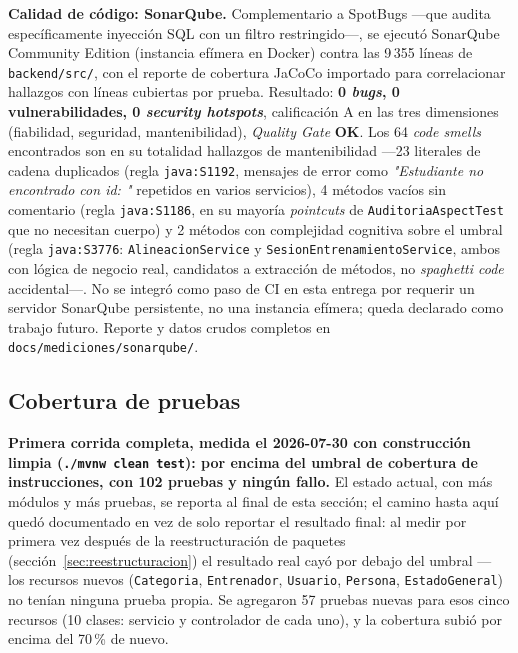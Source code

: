 \documentclass[11pt,a4paper]{article}
\newcommand{\ruta}[1]{\texttt{\footnotesize #1}}
\newcommand{\ok}{\textcolor{okverde}{\textbf{OK}}}
\begin{document}
\textbf{Calidad de código: SonarQube.} Complementario a SpotBugs
—que audita específicamente inyección SQL con un filtro restringido—,
se ejecutó SonarQube Community Edition (instancia efímera en Docker)
contra las 9\,355 líneas de \texttt{backend/src/}, con el reporte de
cobertura JaCoCo importado para correlacionar hallazgos con líneas
cubiertas por prueba. Resultado: \textbf{0 \emph{bugs}, 0
vulnerabilidades, 0 \emph{security hotspots}}, calificación A en las
tres dimensiones (fiabilidad, seguridad, mantenibilidad), \emph{Quality
Gate} \ok. Los 64 \emph{code smells} encontrados son en su totalidad
hallazgos de mantenibilidad —23 literales de cadena duplicados (regla
\texttt{java:S1192}, mensajes de error como \emph{"Estudiante no
encontrado con id: "} repetidos en varios servicios), 4 métodos vacíos
sin comentario (regla \texttt{java:S1186}, en su mayoría \emph{pointcuts}
de \texttt{AuditoriaAspectTest} que no necesitan cuerpo) y 2 métodos con
complejidad cognitiva sobre el umbral (regla \texttt{java:S3776}:
\texttt{AlineacionService} y \texttt{SesionEntrenamientoService}, ambos
con lógica de negocio real, candidatos a extracción de métodos, no
\emph{spaghetti code} accidental—. No se integró como paso de CI en
esta entrega por requerir un servidor SonarQube persistente, no una
instancia efímera; queda declarado como trabajo futuro. Reporte y datos
crudos completos en \ruta{docs/mediciones/sonarqube/}.

\subsection{Cobertura de pruebas}
\label{sec:cobertura}

\textbf{Primera corrida completa, medida el 2026-07-30 con construcción
limpia (\texttt{./mvnw clean test}): por encima del umbral de cobertura
de instrucciones, con 102 pruebas y ningún fallo.}
El estado actual, con más módulos y más pruebas, se reporta al final de
esta sección; el camino hasta aquí quedó documentado en vez de solo
reportar el resultado final: al medir por primera vez después de la
reestructuración de paquetes (sección~\ref{sec:reestructuracion}) el
resultado real cayó por debajo del umbral — los recursos nuevos
(\texttt{Categoria}, \texttt{Entrenador}, \texttt{Usuario},
\texttt{Persona}, \texttt{EstadoGeneral}) no tenían ninguna prueba propia.
Se agregaron 57 pruebas nuevas para esos cinco recursos (10 clases:
servicio y controlador de cada uno), y la cobertura subió por encima del
70\,\% de nuevo.
\end{document}
